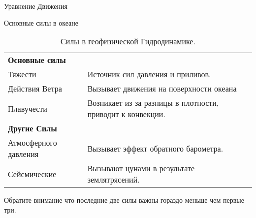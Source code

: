 \begin{chapter}{Уравнение Движения}
\begin{section}{Основные силы в океане}
\begin{table}
\caption{Силы в геофизической Гидродинамике.}
\begin{tabular}{ll}
\textbf{Основные силы} \\
Тяжести&Источник сил давления и приливов.\\
Действия Ветра&Вызывает движения на поверхности океана\\
Плавучести&Возникает из за разницы в плотности, приводит к конвекции.\\
\textbf{Другие Силы} \\
Атмосферного давления&Вызывает эффект обратного барометра.\\
Сейсмические&Вызывают цунами в результате землятрясений.\\
\end{tabular}
Обратите внимание что последние две силы важны гораздо меньше чем первые три.
\end{table}
%
\end{section}


\end{chapter}
